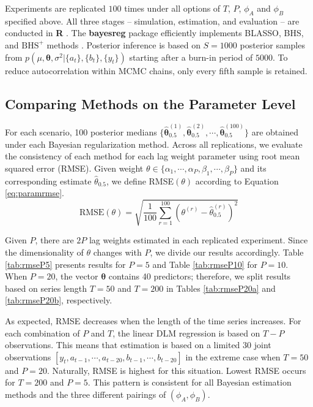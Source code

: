 Experiments are replicated $100$ times under all options of $T$, $P$, $\phi_A$ and $\phi_B$ specified above. All three stages -- simulation, estimation, and evaluation -- are conducted in \textbf{R} \citep{RCORETEAM}. The \textbf{bayesreg} package efficiently implements BLASSO, BHS, and $\textrm{BHS}^+$ methods \citep{bayesreg}. Posterior inference is based on $S=1000$ posterior samples from $p(\mu,\bm{\theta},\sigma^2|\{a_t\},\{b_t\},\{y_t\})$ starting after a burn-in period of $5000$. To reduce autocorrelation within MCMC chains, only every fifth sample is retained.

\subsection{Comparing Methods on the Parameter Level}
\label{sec:paramcomp}
For each scenario, 100 posterior medians $\{\hat{\bm{\theta}}^{(1)}_{0.5}, \hat{\bm{\theta}}^{(2)}_{0.5}, \cdots, \hat{\bm{\theta}}^{(100)}_{0.5}\}$ are obtained under each Bayesian regularization method. Across all replications, we evaluate the consistency of each method for each lag weight parameter using root mean squared error (RMSE). Given weight $\theta \in \{\alpha_1,\cdots,\alpha_P,\beta_1,\cdots,\beta_P\}$ and its corresponding estimate $\hat{\theta}_{0.5}$, we define RMSE$(\theta)$ according to Equation \ref{eq:paramrmse}.
\begin{equation}
\label{eq:paramrmse}
\textrm{RMSE}(\theta)=\sqrt{\frac{1}{100}\sum\limits_{r=1}^{100}(\theta^{(r)}-\hat{\theta}^{(r)}_{0.5})^2}
\end{equation}

Given $P$, there are $2P$ lag weights estimated in each replicated experiment. Since the dimensionality of $\theta$ changes with $P$, we divide our results accordingly. Table \ref{tab:rmseP5} presents results for $P=5$ and Table \ref{tab:rmseP10} for $P=10$. When $P=20$, the vector $\bm{\theta}$ contains 40 predictors; therefore, we split results based on series length $T=50$ and $T=200$ in Tables \ref{tab:rmseP20a} and \ref{tab:rmseP20b}, respectively. 

As expected, RMSE decreases when the length of the time series increases. For each combination of $P$ and $T$, the linear DLM regression is based on $T-P$ observations. This means that estimation is based on a limited 30 joint observations $[y_t,a_{t-1},\cdots,a_{t-20},b_{t-1},\cdots,b_{t-20}]$ in the extreme case when $T=50$ and $P=20$. Naturally, RMSE is highest for this situation. Lowest RMSE occurs for $T=200$ and $P=5$. This pattern is consistent for all Bayesian estimation methods and the three different pairings of $(\phi_A,\phi_B)$.

